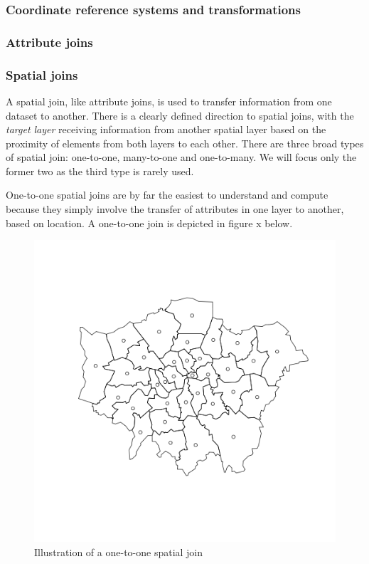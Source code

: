 \documentclass[]{article}
\makeatletter
\def\maxwidth{\ifdim\Gin@nat@width>\linewidth\linewidth
\else\Gin@nat@width\fi}
\let\Oldincludegraphics\includegraphics
\renewcommand{\includegraphics}[1]{\Oldincludegraphics[width=\maxwidth]{#1}}
\makeatother
\begin{document}
\subsubsection{Coordinate reference systems and transformations}

\subsubsection{Attribute joins}

\subsubsection{Spatial joins}

A spatial join, like attribute joins, is used to transfer information
from one dataset to another. There is a clearly defined direction to
spatial joins, with the \emph{target layer} receiving information from
another spatial layer based on the proximity of elements from both
layers to each other. There are three broad types of spatial join:
one-to-one, many-to-one and one-to-many. We will focus only the former
two as the third type is rarely used.

One-to-one spatial joins are by far the easiest to understand and
compute because they simply involve the transfer of attributes in one
layer to another, based on location. A one-to-one join is depicted in
figure x below.

\begin{figure}[htbp]
\centering
\includegraphics{figure/Illustration_of_a_one-to-one_spatial_join_.png}
\caption{Illustration of a one-to-one spatial join}
\end{figure}
\end{document}
